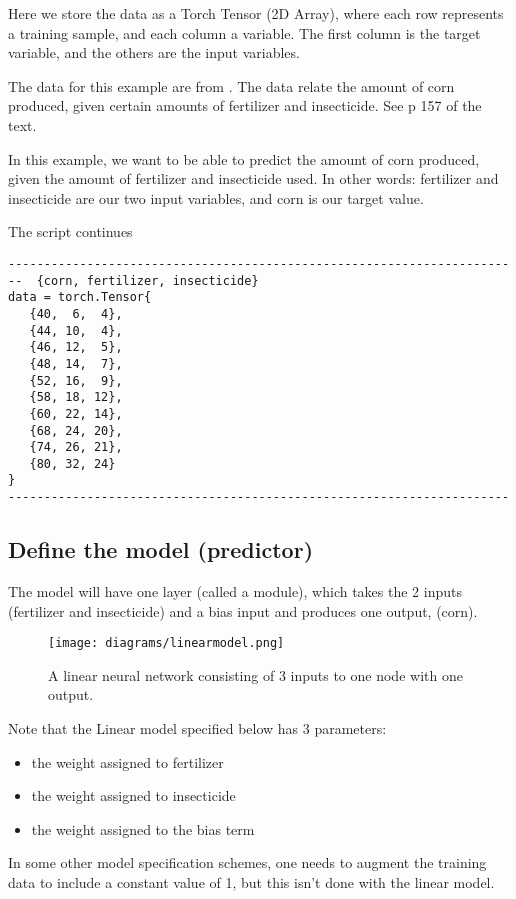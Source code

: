 Here we store the data as a Torch Tensor (2D Array), where each
row represents a training sample, and each column a variable. The
first column is the target variable, and the others are the
input variables.

The data for this example are from \cite{schaum}.
The data relate the amount of corn produced, given certain amounts
of fertilizer and insecticide. See p 157 of the text.

In this example, we want to be able to predict the amount of
corn produced, given the amount of fertilizer and insecticide used.
In other words: fertilizer and insecticide are our two input variables,
and corn is our target value.

The script continues

\begin{verbatim}
----------------------------------------------------------------------
--  {corn, fertilizer, insecticide}
data = torch.Tensor{
   {40,  6,  4},
   {44, 10,  4},
   {46, 12,  5},
   {48, 14,  7},
   {52, 16,  9},
   {58, 18, 12},
   {60, 22, 14},
   {68, 24, 20},
   {74, 26, 21},
   {80, 32, 24}
}
----------------------------------------------------------------------
\end{verbatim}

\subsection{Define the model (predictor)}

The model will have one layer (called a module), which takes the 
2 inputs (fertilizer and insecticide) and a bias input and produces one output, 
(corn).

\begin{figure}[H]
\centering
\texttt{[image: diagrams/linearmodel.png]}
\caption{A linear neural network consisting of 3 inputs to one node with one output.}
\label{fig:linearmodel}
\end{figure}


Note that the Linear model specified below has 3 parameters:

\begin{itemize}
\item the weight assigned to fertilizer
\item the weight assigned to insecticide
\item the weight assigned to the bias term
\end{itemize}

In some other model specification schemes, one needs to augment the
training data to include a constant value of 1, but this isn't done
with the linear model.

